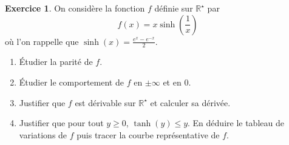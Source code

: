 \documentclass[a4paper, 11pt,openany]{article}%
\theoremstyle{plain}
\theoremstyle{definition}
\newtheorem{exo}{Exercice}
\theoremstyle{remark}
\newcommand{\R}{\mathbb{R}}
\begin{document}
\begin{exo}
On considère la fonction $f$ définie sur $\R^{\star}$ par 
\[ f(x)= x \sinh \left( \frac{1}{x} \right)\]
où l'on rappelle que $\sinh(x) = \frac{e^x - e^{-x}}{2}$.
\begin{enumerate}
\item Étudier la parité de $f$.
\item Étudier le comportement de $f$ en $\pm \infty$ et en $0$.
\item Justifier que $f$ est dérivable sur $\R^{\star}$ et calculer sa dérivée.
\item Justifier que pour tout $y \geqslant 0$, $\tanh(y) \leqslant y$. En déduire le tableau de variations de $f$ puis tracer la courbe représentative de $f$.
\end{enumerate}
\end{exo}
\end{document}
